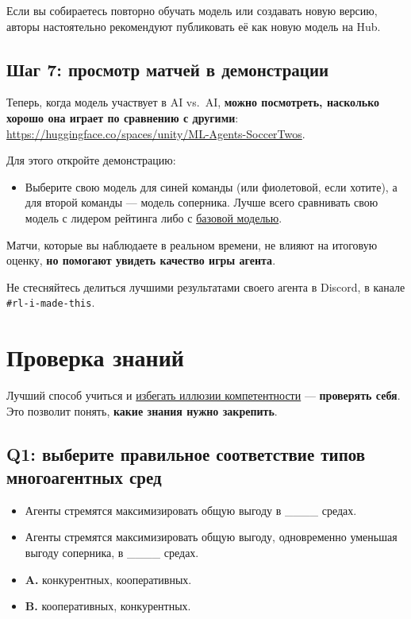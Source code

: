 \documentclass[11pt,a4paper]{article}
\begin{document}
Если вы собираетесь повторно обучать модель или создавать новую версию, авторы настоятельно рекомендуют публиковать её как новую модель на Hub.

\subsection{Шаг 7: просмотр матчей в демонстрации}\label{step-7-visualize-some-match-in-our-demo}

Теперь, когда модель участвует в AI vs.~AI, \textbf{можно посмотреть, насколько хорошо она играет по сравнению с другими}: \url{https://huggingface.co/spaces/unity/ML-Agents-SoccerTwos}.

Для этого откройте демонстрацию:

\begin{itemize}
\tightlist
\item
  Выберите свою модель для синей команды (или фиолетовой, если хотите), а для второй команды --- модель соперника. Лучше всего сравнивать свою модель с лидером рейтинга либо с \href{https://huggingface.co/unity/MLAgents-SoccerTwos}{базовой моделью}.
\end{itemize}

Матчи, которые вы наблюдаете в реальном времени, не влияют на итоговую оценку, \textbf{но помогают увидеть качество игры агента}.

Не стесняйтесь делиться лучшими результатами своего агента в Discord, в канале \texttt{\#rl-i-made-this}.

\section{Проверка знаний}\label{quiz}

Лучший способ учиться и \href{https://www.coursera.org/lecture/learning-how-to-learn/illusions-of-competence-BuFzf}{избегать иллюзии компетентности} --- \textbf{проверять себя}. Это позволит понять, \textbf{какие знания нужно закрепить}.

\subsection{Q1: выберите правильное соответствие типов многоагентных сред}\label{q1-chose-the-option-which-fits-better-when-comparing-different-types-of-multi-agent-environments}

\begin{itemize}
\item
  Агенты стремятся максимизировать общую выгоду в \_\_\_\_ средах.
\item
  Агенты стремятся максимизировать общую выгоду, одновременно уменьшая выгоду соперника, в \_\_\_\_ средах.
\item
  \textbf{A.} конкурентных, кооперативных.
\item
  \textbf{B.} кооперативных, конкурентных.
\end{itemize}
\end{document}
